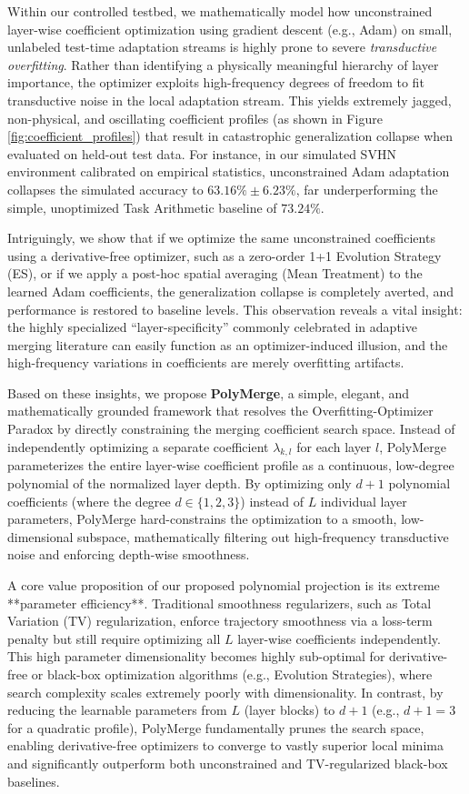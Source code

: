 Within our controlled testbed, we mathematically model how unconstrained layer-wise coefficient optimization using gradient descent (e.g., Adam) on small, unlabeled test-time adaptation streams is highly prone to severe \emph{transductive overfitting}. Rather than identifying a physically meaningful hierarchy of layer importance, the optimizer exploits high-frequency degrees of freedom to fit transductive noise in the local adaptation stream. This yields extremely jagged, non-physical, and oscillating coefficient profiles (as shown in Figure \ref{fig:coefficient_profiles}) that result in catastrophic generalization collapse when evaluated on held-out test data. For instance, in our simulated SVHN environment calibrated on empirical statistics, unconstrained Adam adaptation collapses the simulated accuracy to $63.16\% \pm 6.23\%$, far underperforming the simple, unoptimized Task Arithmetic baseline of $73.24\%$.

Intriguingly, we show that if we optimize the same unconstrained coefficients using a derivative-free optimizer, such as a zero-order 1+1 Evolution Strategy (ES), or if we apply a post-hoc spatial averaging (Mean Treatment) to the learned Adam coefficients, the generalization collapse is completely averted, and performance is restored to baseline levels. This observation reveals a vital insight: the highly specialized ``layer-specificity'' commonly celebrated in adaptive merging literature can easily function as an optimizer-induced illusion, and the high-frequency variations in coefficients are merely overfitting artifacts.

Based on these insights, we propose \textbf{PolyMerge}, a simple, elegant, and mathematically grounded framework that resolves the Overfitting-Optimizer Paradox by directly constraining the merging coefficient search space. Instead of independently optimizing a separate coefficient $\lambda_{k, l}$ for each layer $l$, PolyMerge parameterizes the entire layer-wise coefficient profile as a continuous, low-degree polynomial of the normalized layer depth. By optimizing only $d+1$ polynomial coefficients (where the degree $d \in \{1, 2, 3\}$) instead of $L$ individual layer parameters, PolyMerge hard-constrains the optimization to a smooth, low-dimensional subspace, mathematically filtering out high-frequency transductive noise and enforcing depth-wise smoothness.

A core value proposition of our proposed polynomial projection is its extreme **parameter efficiency**. Traditional smoothness regularizers, such as Total Variation (TV) regularization, enforce trajectory smoothness via a loss-term penalty but still require optimizing all $L$ layer-wise coefficients independently. This high parameter dimensionality becomes highly sub-optimal for derivative-free or black-box optimization algorithms (e.g., Evolution Strategies), where search complexity scales extremely poorly with dimensionality. In contrast, by reducing the learnable parameters from $L$ (layer blocks) to $d+1$ (e.g., $d+1 = 3$ for a quadratic profile), PolyMerge fundamentally prunes the search space, enabling derivative-free optimizers to converge to vastly superior local minima and significantly outperform both unconstrained and TV-regularized black-box baselines.

